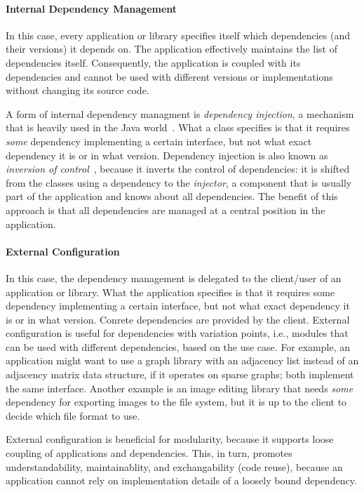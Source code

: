 \paragraph{Internal Dependency Management}
In this case, every application or library specifies itself which dependencies (and their versions) it depends on. The application effectively maintains the list of dependencies itself. Consequently, the application is coupled with its dependencies and cannot be used with different versions or implementations without changing its source code.

A form of internal dependency managment is \emph{dependency injection}, a mechanism that is heavily used in the Java world~\cite{Prasanna:2009:DI:1795686}. What a class specifies is that it requires \emph{some} dependency implementing a certain interface, but not what exact dependency it is or in what version. Dependency injection is also known as \emph{inversion of control}~\cite{fowlerioc}, because it inverts the control of dependencies: it is shifted from the classes using a dependency to the \emph{injector}, a component that is usually part of the application and knows about all dependencies. The benefit of this approach is that all dependencies are managed at a central position in the application.

\paragraph{External Configuration}
In this case, the dependency management is delegated to the client/user of an application or library. What the application specifies is that it requires some dependency implementing a certain interface, but not what exact dependency it is or in what version. Conrete dependencies are provided by the client. External configuration is useful for dependencies with variation points, i.e., modules that can be used with different dependencies, based on the use case. For example, an application might want to use a graph library with an adjacency list instead of an adjacency matrix data structure, if it operates on sparse graphs; both implement the same interface. Another example is an image editing library that needs \emph{some} dependency for exporting images to the file system, but it is up to the client to decide which file format to use. 

External configuration is beneficial for modularity, because it supports loose coupling of applications and dependencies. This, in turn, promotes understandability, maintainablity, and exchangability (code reuse), because an application cannot rely on implementation details of a loosely bound dependency.

